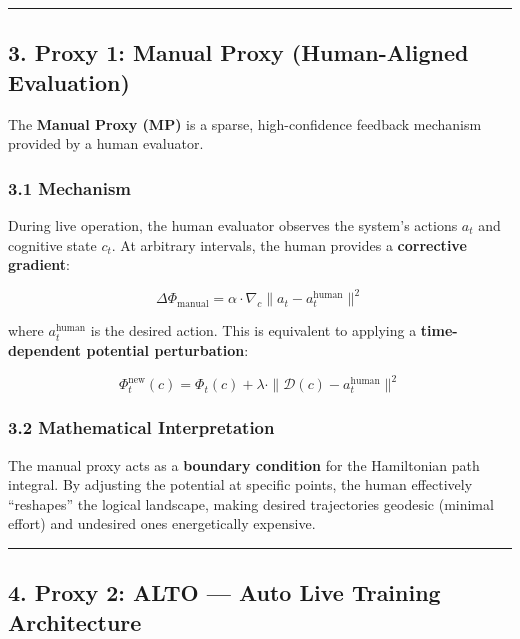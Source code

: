 \documentclass[
  11pt,
  a4paper,
]{article}
\begin{document}
\begin{center}\rule{0.5\linewidth}{0.5pt}\end{center}

\subsection{3. Proxy 1: Manual Proxy (Human-Aligned
Evaluation)}\label{proxy-1-manual-proxy-human-aligned-evaluation}

The \textbf{Manual Proxy (MP)} is a sparse, high-confidence feedback
mechanism provided by a human evaluator.

\subsubsection{3.1 Mechanism}\label{mechanism}

During live operation, the human evaluator observes the system's actions
\(a_t\) and cognitive state \(c_t\). At arbitrary intervals, the human
provides a \textbf{corrective gradient}:

\[\Delta \Phi_{\text{manual}} = \alpha \cdot \nabla_c \|a_t - a_t^{\text{human}}\|^2\]

where \(a_t^{\text{human}}\) is the desired action. This is equivalent
to applying a \textbf{time-dependent potential perturbation}:

\[\Phi_t^{\text{new}}(c) = \Phi_t(c) + \lambda \cdot \| \mathcal{D}(c) - a_t^{\text{human}} \|^2\]

\subsubsection{3.2 Mathematical
Interpretation}\label{mathematical-interpretation}

The manual proxy acts as a \textbf{boundary condition} for the
Hamiltonian path integral. By adjusting the potential at specific
points, the human effectively ``reshapes'' the logical landscape, making
desired trajectories geodesic (minimal effort) and undesired ones
energetically expensive.

\begin{center}\rule{0.5\linewidth}{0.5pt}\end{center}

\subsection{4. Proxy 2: ALTO --- Auto Live Training
Architecture}\label{proxy-2-alto-auto-live-training-architecture}
\end{document}
